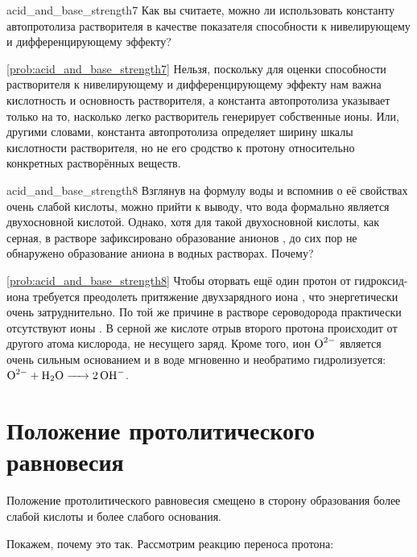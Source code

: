 \begin{problem}{}{acid_and_base_strength7}
    Как вы считаете, можно ли использовать константу автопротолиза растворителя в качестве показателя способности к нивелирующему и дифференцирующему эффекту?
    \begin{sol}{\ref{prob:acid_and_base_strength7}}
        Нельзя, поскольку для оценки способности растворителя к нивелирующему и дифференцирующему эффекту нам важна кислотность и основность растворителя, а константа автопротолиза указывает только на то, насколько легко растворитель генерирует собственные ионы. Или, другими словами, константа автопротолиза определяет ширину шкалы кислотности растворителя, но не его сродство к протону относительно конкретных растворённых веществ.
    \end{sol}
\end{problem}

\begin{problem}{}{acid_and_base_strength8}
    Взглянув на формулу воды  и вспомнив о её свойствах очень слабой кислоты, можно прийти к выводу, что вода формально является двухосновной кислотой. Однако, хотя для такой двухосновной кислоты, как серная, в растворе зафиксировано образование анионов , до сих пор не обнаружено образование аниона  в водных растворах. Почему?
    \begin{sol}{\ref{prob:acid_and_base_strength8}}
        Чтобы оторвать ещё один протон от гидроксид-иона  требуется преодолеть притяжение двухзарядного иона , что энергетически очень затруднительно. По той же причине в растворе сероводорода практически отсутствуют ионы . В серной же кислоте отрыв второго протона происходит от другого атома кислорода, не несущего заряд. Кроме того, ион $\ce{O^{2-}}$ является очень сильным основанием и в воде мгновенно и необратимо гидролизуется: $\ce{O^{2-} + H2O -> 2OH^-}$.

    \end{sol}
\end{problem}

\clearpage

\section{Положение протолитического равновесия}

Положение протолитического равновесия смещено в сторону образования более слабой кислоты и более слабого основания.

Покажем, почему это так. Рассмотрим реакцию переноса протона:


